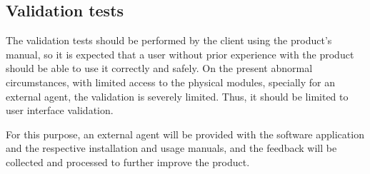 \subsection{Validation tests}%
\label{sec:orgff1a37d}
The validation tests should be performed by the client using the product’s
manual, so it is expected that a user without prior experience with the product
should be able to use it correctly and safely. On the present abnormal
circumstances, with limited access to the physical modules, specially for an
external agent, the validation is severely limited.
Thus, it should be limited to user interface validation.

For this purpose, an external agent will be provided with the software
application and the respective installation and usage manuals, and the feedback
will be collected and processed to further improve the product.
